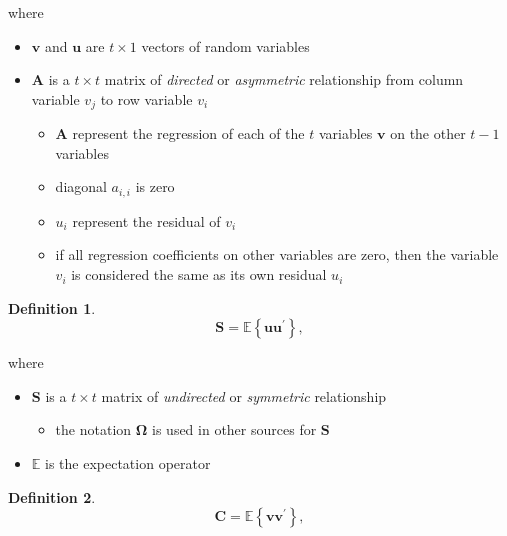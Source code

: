 \documentclass[
]{book}
\providecommand{\tightlist}{%
  \setlength{\itemsep}{0pt}\setlength{\parskip}{0pt}}
\theoremstyle{definition}
\newtheorem{definition}{Definition}[chapter]
\theoremstyle{definition}
\theoremstyle{definition}
\theoremstyle{remark}
\begin{document}
\noindent where

\begin{itemize}
\tightlist
\item
  \(\mathbf{v}\) and \(\mathbf{u}\) are \(t \times 1\) vectors of random variables
\item
  \(\mathbf{A}\) is a \(t \times t\) matrix
  of \emph{directed} or \emph{asymmetric} relationship
  from column variable \(v_j\) to row variable \(v_i\)

  \begin{itemize}
  \tightlist
  \item
    \(\mathbf{A}\) represent the regression
    of each of the \(t\) variables \(\mathbf{v}\) on the other \(t - 1\) variables
  \item
    diagonal \(a_{i,i}\) is zero
  \item
    \(u_i\) represent the residual of \(v_i\)
  \item
    if all regression coefficients on other variables are zero,
    then the variable \(v_i\) is considered the same as its own residual \(u_i\)
  \end{itemize}
\end{itemize}

\begin{definition}
\protect\hypertarget{def:unnamed-chunk-3}{}{\label{def:unnamed-chunk-3} }\begin{equation}
  \mathbf{S}
  =
  \mathbb{E}
  \left\{
    \mathbf{u} \mathbf{u}^{\prime}
  \right\} ,
\end{equation}
\end{definition}

\noindent where

\begin{itemize}
\tightlist
\item
  \(\mathbf{S}\) is a \(t \times t\) matrix
  of \emph{undirected} or \emph{symmetric} relationship

  \begin{itemize}
  \tightlist
  \item
    the notation \(\boldsymbol{\Omega}\) is used in other sources for \(\mathbf{S}\)
  \end{itemize}
\item
  \(\mathbb{E}\) is the expectation operator
\end{itemize}

\begin{definition}
\protect\hypertarget{def:unnamed-chunk-4}{}{\label{def:unnamed-chunk-4} }\begin{equation}
  \mathbf{C}
  =
  \mathbb{E}
  \left\{
    \mathbf{v} \mathbf{v}^{\prime}
  \right\} ,
\end{equation}
\end{definition}
\end{document}
